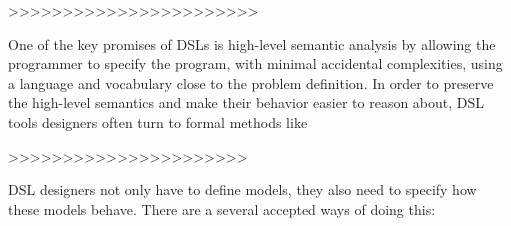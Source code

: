 >>>>>>>>>>>>>>>>>>>>>>>


One of the key promises of DSLs is high-level semantic analysis by allowing the programmer to specify the program, with minimal accidental complexities, using a  language and vocabulary close to the problem definition. In order to preserve the high-level semantics and make their behavior easier to reason about, DSL tools designers often turn to formal methods like 



>>>>>>>>>>>>>>>>>>>>>>

DSL designers not only have to define models, they also need to specify how these models behave. There are a several accepted ways of doing this: 




